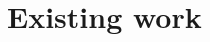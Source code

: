 \chapter{Existing work}
\label{ch:existing_work}

\begin{comment}

\section{Ontologies for weather data}

\subsection{Semantic Sensor Web}

\subsection{SemSOS}

\subsection{NextGen}

\subsection{SWEET}

\section{Related ontologies}

\subsection{SWIG Basic Geo (WGS84 lat/long) Vocabulary}

\subsection{OWL-Time}

\end{comment}
